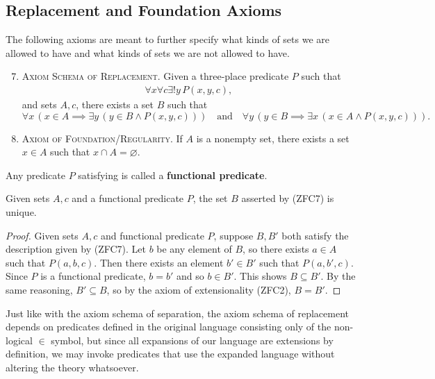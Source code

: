 \subsection{Replacement and Foundation Axioms}

The following axioms are meant to further specify what kinds of sets we are allowed to have and what kinds of sets we are not allowed to have. 

\begin{enumerate}[itemsep=-0.4ex, label=\textup{(ZFC${\arabic*}$)}]\setcounter{enumi}{6}
	\item\textsc{Axiom Schema of Replacement.}
	Given a three-place predicate $P$ such that
	\begin{align}\label{ch1eqn_func_pred}
		\forall x\forall c\exists ! y\, P(x, y, c),
	\end{align}
	and sets $A, c$, there exists a set $B$ such that 
	\[ \forall x\, (x\in A\implies \exists y\, (y\in B\land P(x, y, c))) \quad\text{and}\quad \forall y\, (y\in B\implies \exists x\, (x\in A\land P(x, y, c))). \]
	\item\textsc{Axiom of Foundation/Regularity.}
	If $A$ is a nonempty set, there exists a set $x\in A$ such that $x\cap A = \varnothing$. 
\end{enumerate}

Any predicate $P$ satisfying  is called a \textbf{functional predicate}.

\begin{prop}
	Given sets $A, c$ and a functional predicate $P$, the set $B$ asserted by \textup{(ZFC7)} is unique.
\end{prop}
\begin{proof}
	Given sets $A, c$ and functional predicate $P$, suppose $B, B'$ both satisfy the description given by (ZFC7).
	Let $b$ be any element of $B$, so there exists $a\in A$ such that $P(a, b, c)$.
	Then there exists an element $b'\in B'$ such that $P(a, b', c)$. 
	Since $P$ is a functional predicate, $b = b'$ and so $b\in B'$. 
	This shows $B\subseteq B'$. 
	By the same reasoning, $B'\subseteq B$, so by the axiom of extensionality (ZFC2), $B = B'$. 
\end{proof}

Just like with the axiom schema of separation, the axiom schema of replacement depends on predicates defined in the original language consisting only of the non-logical $\in$ symbol, but since all expansions of our language are extensions by definition, we may invoke predicates that use the expanded language without altering the theory whatsoever. 

